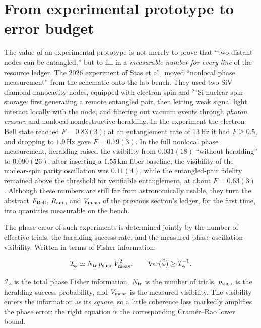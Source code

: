 \section{From experimental prototype to error budget}
\label{sec:e24-prototype}

The value of an experimental prototype is not merely to prove that ``two distant nodes can be entangled,'' but to fill in a \emph{measurable number for every line} of the resource ledger. The 2026 experiment of Stas et al.\ moved ``nonlocal phase measurement'' from the schematic onto the lab bench. They used two SiV diamond-nanocavity nodes, equipped with electron-spin and \({}^{29}\mathrm{Si}\) nuclear-spin storage: first generating a remote entangled pair, then letting weak signal light interact locally with the node, and filtering out vacuum events through \emph{photon erasure} and nonlocal nondestructive heralding. In the experiment the electron Bell state reached \(F=0.83(3)\); at an entanglement rate of \(13\,\mathrm{Hz}\) it had \(F\ge0.5\), and dropping to \(1.9\,\mathrm{Hz}\) gave \(F=0.79(3)\). In the full nonlocal phase measurement, heralding raised the visibility from \(0.031(18)\) ``without heralding'' to \(0.090(26)\); after inserting a \(1.55\,\mathrm{km}\) fiber baseline, the visibility of the nuclear-spin parity oscillation was \(0.11(4)\), while the entangled-pair fidelity remained above the threshold for verifiable entanglement, at about \(F=0.63(3)\) \citep{2026Natur.651..326S}. Although these numbers are still far from astronomically usable, they turn the abstract \(F_{\rm Bell}\), \(R_{\rm ent}\), and \(V_{\rm meas}\) of the previous section's ledger, for the first time, into quantities measurable on the bench.

The phase error of such experiments is determined jointly by the number of effective trials, the heralding success rate, and the measured phase-oscillation visibility. Written in terms of Fisher information:

\begin{equation}
  \mathcal I_\phi
  \simeq
  N_{\rm tr}\,p_{\rm succ}\,V_{\rm meas}^2,
  \qquad
  \mathrm{Var}(\hat\phi)\ge\mathcal I_\phi^{-1} .
  \label{eq:e24-fisher-visibility}
\end{equation}
\begin{formulaexplain}
\(\mathcal I_\phi\) is the total phase Fisher information, \(N_{\rm tr}\) is the number of trials, \(p_{\rm succ}\) is the heralding success probability, and \(V_{\rm meas}\) is the measured visibility. The visibility enters the information as its \emph{square}, so a little coherence loss markedly amplifies the phase error; the right equation is the corresponding Cramér--Rao lower bound.
\end{formulaexplain}

